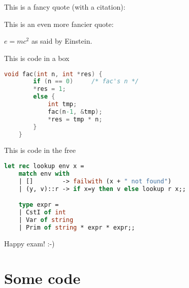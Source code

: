 \documentclass{ituhandin}
\begin{document}
%
\maketitlepage
\signpage

\chapter{}

This is a fancy quote (with a citation):

This is an even more fancier quote:

$e=mc^2$ as said by Einstein\cite{einstein}.

This is code in a box

\begin{lstlisting}[language=C, caption=This is a caption]
    void fac(int n, int *res) {
        if (n == 0)     /* fac's n */
        *res = 1;
        else {
            int tmp;
            fac(n-1, &tmp);
            *res = tmp * n;
        }
    }
\end{lstlisting}


This is code in the free

\begin{lstlisting}[language=ML, frame={}]
    let rec lookup env x =
    match env with 
    | []        -> failwith (x + " not found")
    | (y, v)::r -> if x=y then v else lookup r x;;

    type expr = 
    | CstI of int
    | Var of string
    | Prim of string * expr * expr;;
\end{lstlisting}


Happy exam! :-)


\chapter{}
\section{}
\section{}




\styleAppendix
\appendix
\chapter{Some code}

\label{LastPage}
\end{document}
